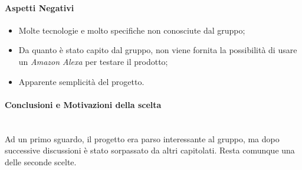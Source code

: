 \paragraph{Aspetti Negativi}
\begin{itemize}
	\item Molte tecnologie e molto specifiche non conosciute dal gruppo;
	\item Da quanto è stato capito dal gruppo, non viene fornita la possibilità di usare un \textit{Amazon Alexa} per testare il prodotto;
	\item Apparente semplicità del progetto.
\end{itemize}

\paragraph{Conclusioni e Motivazioni della scelta}\-\\
Ad un primo sguardo, il progetto era parso interessante al gruppo, ma dopo successive discussioni è stato sorpassato da altri capitolati. Resta comunque una delle seconde scelte.